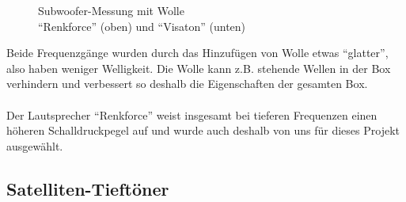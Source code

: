 \begin{figure} [H]
	\centering
	\quad
	\caption{Subwoofer-Messung mit Wolle\\ \enquote{Renkforce} (oben) und \enquote{Visaton} (unten)}
	\label{fig:5.3.3.3}
\end{figure}
Beide Frequenzgänge wurden durch das Hinzufügen von Wolle etwas \enquote{glatter}, also haben weniger Welligkeit. Die Wolle kann z.B. stehende Wellen in der Box verhindern und verbessert so deshalb die Eigenschaften der gesamten Box.\\ \\
Der Lautsprecher \enquote{Renkforce} weist insgesamt bei tieferen Frequenzen einen höheren Schalldruckpegel auf und wurde auch deshalb von uns für dieses Projekt ausgewählt.

\subsection{Satelliten-Tieftöner} \label{5.3.4}












